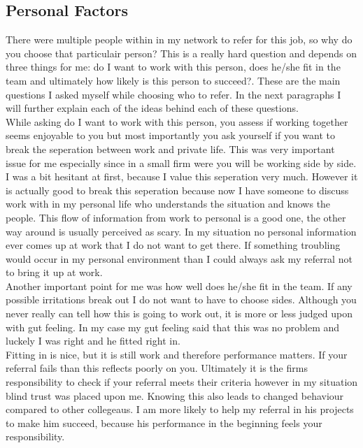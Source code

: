 \documentclass[Main.tex]{subfiles}
\begin{document}
\subsection*{Personal Factors}

There were multiple people within in my network to refer for this job, so why do you choose that particulair person? This is a really hard question and depends  on three things for me: do I want to work with this person, does he/she fit in the team and ultimately how likely is this person to succeed?. These are the main questions I asked myself while choosing who to refer. In the next paragraphs I will further explain each of the ideas behind each of these questions.\\

While asking do I want to work with this person, you assess if working together seems enjoyable to you but most importantly you ask yourself if you want to break the seperation between work and private life. This was very important issue for me especially since in a small firm were you will be working side by side. I was a bit hesitant at first, because I value this seperation very much. However it is actually good to break this seperation because now I have someone to discuss work with in my personal life who understands the situation and knows the people. This flow of information from work to personal is a good one, the other way around is usually perceived as scary. In my situation no personal information ever comes up at work that I do not want to get there. If something troubling would occur in my personal environment than I could always ask my referral not to bring it up at work. \\

Another important point for me was how well does he/she fit in the team. If any possible irritations break out I do not want to have to choose sides. Although you never really can tell how this is going to work out, it is more or less judged upon with gut feeling. In my case my gut feeling said that this was no problem and luckely I was right and he fitted right in.\\

Fitting in is nice, but it is still work and therefore performance matters. If your referral fails than this reflects poorly on you. Ultimately it is the firms responsibility to check if your referral meets their criteria however in my situation blind trust was placed upon me. Knowing this also leads to changed behaviour compared to other collegeaus. I am more likely to help my referral in his projects to make him succeed, because his performance in the beginning feels your responsibility. \\
\end{document}
